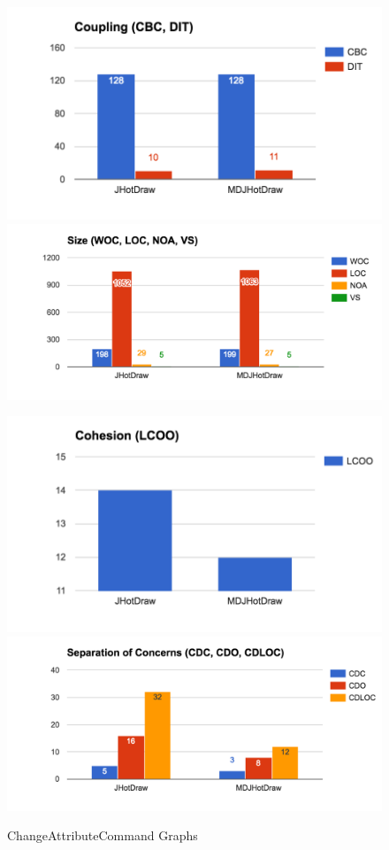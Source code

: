 \begin{figure}[H]
	\includegraphics[scale=0.5]{figures/metrics/Metric_Undo_Coupling.png}
	\includegraphics[scale=0.45]{figures/metrics/Metric_Undo_Size.png}

	\includegraphics[scale=0.5]{figures/metrics/Metric_Undo_Cohesion.png}
	\includegraphics[scale=0.45]{figures/metrics/Metric_Undo_SoC.png}
	\caption{ChangeAttributeCommand Graphs}
	\label{Fig:ChangeAttributeCommand Graphs}
\end{figure}
